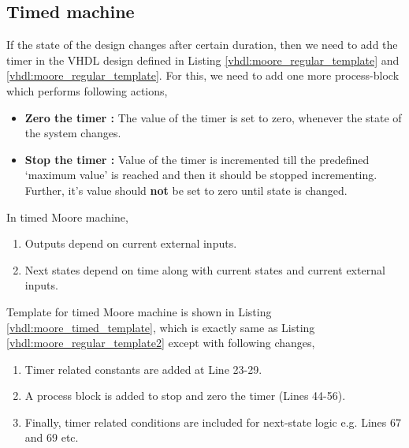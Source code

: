 \subsection{Timed machine}
If the state of the design changes after certain duration, then we need to add the timer in the VHDL design defined in Listing \ref{vhdl:moore_regular_template} and \ref{vhdl:moore_regular_template}. For this, we need to add one more process-block which performs following actions, 
\begin{itemize}
	\item \textbf{Zero the timer : } The value of the timer is set to zero, whenever the state of the system changes. 
	\item \textbf{Stop the timer : } Value of the timer is incremented till the predefined `maximum value' is reached and then it should be stopped incrementing. Further, it's value should \textbf{not} be set to zero until state is changed. 
\end{itemize}

\begin{noNumBox}
	In timed Moore machine, 
	\begin{enumerate}
		\item Outputs depend on current external inputs. 
		\item Next states depend on time along with current states and current external inputs.
	\end{enumerate}
\end{noNumBox}
Template for timed Moore machine is shown in Listing \ref{vhdl:moore_timed_template}, which is exactly same as Listing \ref{vhdl:moore_regular_template2} except with following changes, 
\begin{enumerate}
	\item Timer related constants are added at Line 23-29.
	\item A process block is added to stop and zero the timer (Lines 44-56). 
	\item Finally, timer related conditions are included for next-state logic e.g.  Lines 67 and 69 etc.
\end{enumerate}





